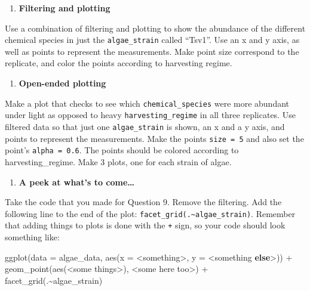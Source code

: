 \documentclass[
]{krantz}
\newenvironment{Shaded}{\begin{snugshade}}{\end{snugshade}}
\newcommand{\AttributeTok}[1]{\textcolor[rgb]{0.77,0.63,0.00}{#1}}
\newcommand{\ControlFlowTok}[1]{\textcolor[rgb]{0.13,0.29,0.53}{\textbf{#1}}}
\newcommand{\FunctionTok}[1]{\textcolor[rgb]{0.00,0.00,0.00}{#1}}
\newcommand{\NormalTok}[1]{#1}
\newcommand{\SpecialCharTok}[1]{\textcolor[rgb]{0.00,0.00,0.00}{#1}}
\providecommand{\tightlist}{%
  \setlength{\itemsep}{0pt}\setlength{\parskip}{0pt}}
\begin{document}
\begin{enumerate}
\def\labelenumi{\arabic{enumi}.}
\setcounter{enumi}{6}
\tightlist
\item
  \textbf{Filtering and plotting}
\end{enumerate}

Use a combination of filtering and plotting to show the abundance of the different chemical species in just the \texttt{algae\_strain} called ``Tsv1''. Use an x and y axis, as well as points to represent the measurements. Make point size correspond to the replicate, and color the points according to harvesting regime.

\begin{enumerate}
\def\labelenumi{\arabic{enumi}.}
\setcounter{enumi}{7}
\tightlist
\item
  \textbf{Open-ended plotting}
\end{enumerate}

Make a plot that checks to see which \texttt{chemical\_species} were more abundant under light as opposed to heavy \texttt{harvesting\_regime} in all three replicates. Use filtered data so that just one \texttt{algae\_strain} is shown, an x and a y axis, and points to represent the measurements. Make the points \texttt{size\ =\ 5} and also set the point's \texttt{alpha\ =\ 0.6}. The points should be colored according to harvesting\_regime. Make 3 plots, one for each strain of algae.

\begin{enumerate}
\def\labelenumi{\arabic{enumi}.}
\setcounter{enumi}{8}
\tightlist
\item
  \textbf{A peek at what's to come\ldots{}}
\end{enumerate}

Take the code that you made for Question 9. Remove the filtering. Add the following line to the end of the plot: \texttt{facet\_grid(.\textasciitilde{}algae\_strain)}. Remember that adding things to plots is done with the \texttt{+} sign, so your code should look something like:

\begin{Shaded}
\begin{Highlighting}[]
\FunctionTok{ggplot}\NormalTok{(}\AttributeTok{data =}\NormalTok{ algae\_data, }\FunctionTok{aes}\NormalTok{(}\AttributeTok{x =} \SpecialCharTok{\textless{}}\NormalTok{something}\SpecialCharTok{\textgreater{}}\NormalTok{, }\AttributeTok{y =} \SpecialCharTok{\textless{}}\NormalTok{something }\ControlFlowTok{else}\SpecialCharTok{\textgreater{}}\NormalTok{)) }\SpecialCharTok{+}
  \FunctionTok{geom\_point}\NormalTok{(}\FunctionTok{aes}\NormalTok{(}\SpecialCharTok{\textless{}}\NormalTok{some things}\SpecialCharTok{\textgreater{}}\NormalTok{), }\SpecialCharTok{\textless{}}\NormalTok{some here too}\SpecialCharTok{\textgreater{}}\NormalTok{) }\SpecialCharTok{+}
  \FunctionTok{facet\_grid}\NormalTok{(.}\SpecialCharTok{\textasciitilde{}}\NormalTok{algae\_strain)}
\end{Highlighting}
\end{Shaded}
\end{document}

